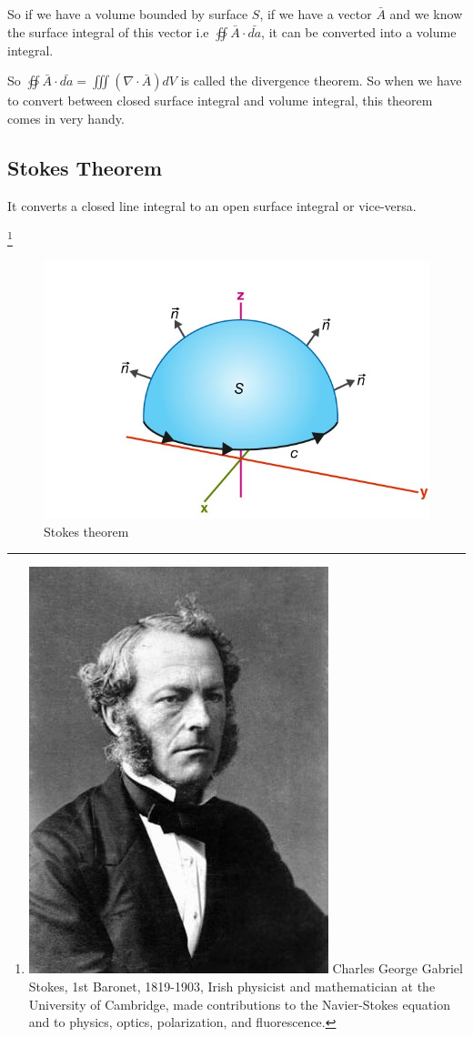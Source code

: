 So if we have a volume bounded by surface $S$, if we have a vector $\bar{A}$ and we know the surface integral of this vector i.e $\oiint \bar{A}\cdot\bar{da}$, it can be converted into a volume integral.


So $\oiint \bar{A} \cdot \bar{da} = \iiint (\nabla \cdot \bar{A})dV$ is called the divergence theorem. So when we have to convert between closed surface integral and volume integral, this theorem comes in very handy.

\subsection{Stokes Theorem}
It converts a closed line integral to an open surface integral or vice-versa.

\footnote{
\includegraphics[scale=0.05]{graphics/georgestokes.png}
Charles George Gabriel Stokes, 1st Baronet, 1819-1903, Irish physicist and mathematician at the University of Cambridge, made contributions to the Navier-Stokes equation and to physics, optics, polarization, and fluorescence.
}

\begin{figure}[h]
\centering
\includegraphics[width=0.7\linewidth]{graphics/fig17.8}
\caption{Stokes theorem}
\end{figure}


